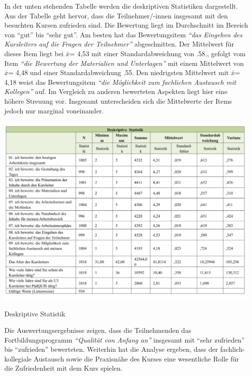 \documentclass[12pt,a4paper]{article}
\begin{document}
In der unten stehenden Tabelle werden die deskriptiven Statistiken dargestellt. Aus der Tabelle geht hervor, dass die Teilnehmer/-innen insgesamt mit den besuchten Kursen zufrieden sind. Die Bewertung liegt im Durchschnitt im Bereich von "`gut"' bis "`sehr gut"'. Am besten hat das Bewertungsitem \textit{"`das Eingehen des Kursleiters auf die Fragen der Teilnehmer"'} abgeschnitten. Der Mittelwert für dieses Item liegt bei $\bar x$= 4,53 mit einer Standardabweichung von .58., gefolgt vom Item \textit{"`die Bewertung der Materialien und Unterlagen"'} mit einem Mittelwert von $\bar x$= 4,48 und einer Standardabweichung .55. Den niedrigsten Mittelwert mit $\bar x$= 4,18 weist das Bewertungsitem \textit{"`die Mög\-lich\-keit zum fachlichen Austausch mit Kollegen"'} auf. Im Vergleich zu anderen bewerteten Aspekten liegt hier eine höhere Streuung vor. Insgesamt unterscheiden sich die Mittelwerte der Items jedoch nur marginal voneinander. 

\begin{table}[!ht]
\includegraphics[scale=0.54]{tab05.pdf}
\caption{Deskriptive Statistik}
\label{}
\end{table}


Die Auswertungsergebnisse zeigen, dass die Teilnehmenden das Fortbildungsprogramm \textit{"`Qualität von Anfang an"'} insgesamt mit "`sehr zufrieden"' bis "`zufrieden"' bewerteten. Weiterhin hat die Analyse ergeben, dass der fachlich-kollegiale Austausch sowie die Praxisnähe des Kurses eine wesentliche Rolle für die Zufriedenheit mit dem Kurs spielen. 
\end{document}
